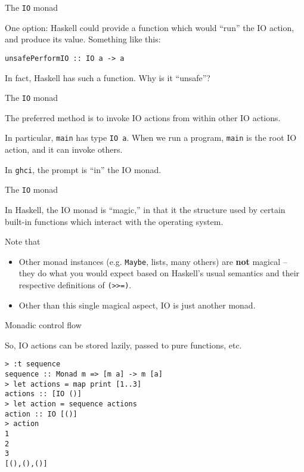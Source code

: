 %
\begin{frame}[fragile]{The \texttt{IO} monad}

One option: Haskell could provide a function which would ``run'' the IO action,
and produce its value. Something like this:

\begin{block}{}
\begin{verbatim}
unsafePerformIO :: IO a -> a
\end{verbatim}
\end{block}

In fact, Haskell has such a function. Why is it ``unsafe''?

\end{frame}

%
\begin{frame}[fragile]{The \texttt{IO} monad}

The preferred method is to invoke IO actions from within other IO actions.

In particular, \texttt{main} has type \texttt{IO a}. When we run a program,
\texttt{main} is the root IO action, and it can invoke others.

In \texttt{ghci}, the prompt is ``in'' the IO monad.

\end{frame}

%
\begin{frame}[fragile]{The \texttt{IO} monad}

In Haskell, the IO monad is ``magic,'' in that it the structure used by certain
built-in functions which interact with the operating system.

Note that

\begin{itemize}

\item Other monad instances (e.g. \texttt{Maybe}, lists, many others) are
\textbf{not} magical -- they do what you would expect based on Haskell's usual
semantics and their respective definitions of \texttt{(>>=)}.

\item Other than this single magical aspect, IO is just another monad.

\end{itemize}

\end{frame}

%
\begin{frame}[fragile]{Monadic control flow}

So, IO actions can be stored lazily, passed to pure functions, etc.

\begin{block}{}
\begin{verbatim}
> :t sequence
sequence :: Monad m => [m a] -> m [a]
> let actions = map print [1..3]
actions :: [IO ()]
> let action = sequence actions
action :: IO [()]
> action
1
2
3
[(),(),()]
\end{verbatim}
\end{block}

\end{frame}

